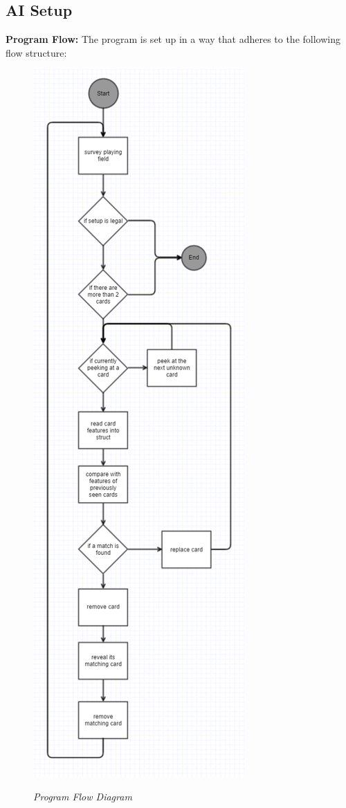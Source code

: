 \subsection{AI Setup}

\textbf{Program Flow:}
The program is set up in a way that adheres to the following flow structure:

%

\begin{figure}[position = here]
	\begin{centering}
		\includegraphics[scale=0.75]{./kkimgs/ProgramFlow.png}\\
		\caption[]{\textit{Program Flow Diagram\label{prgflw}}}
	\end{centering}
\end{figure}

